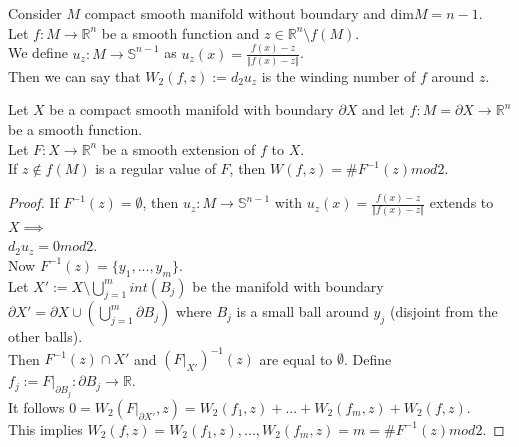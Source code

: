 \begin{remark}\label{8.7}
    Consider $M$ compact smooth manifold without boundary and dim$M=n-1$.\\
    Let $f:M\to\mathbb{R}^n$ be a smooth function and $z\in\mathbb{R}^n\setminus f(M)$.\\
    We define $u_z:M\to\mathbb{S}^{n-1}$ as $u_z(x)=\frac{f(x)-z}{\Vert f(x)-z\Vert}$.\\
    Then we can say that $W_2(f,z):=d_2u_z$ is the winding number of $f$ around $z$.
\end{remark}
\begin{lemma}\label{8.8}
    Let $X$ be a compact smooth manifold with boundary $\partial X$ and let $f:M=\partial X\to \mathbb{R}^n$ be a smooth function.\\
    Let $F:X\to\mathbb{R}^n$ be a smooth extension of $f$ to $X$.\\
    If $z\notin f(M)$ is a regular value of $F$, then $W(f,z)=\#F^{-1}(z) mod 2$.
\end{lemma}
\begin{proof}
    If $F^{-1}(z)=\emptyset$, then $u_z:M\to\mathbb{S}^{n-1}$ with $u_z(x)=\frac{f(x)-z}{\Vert f(x)-z\Vert}$ extends to $X\implies$\\ 
    $d_2u_z=0 mod 2$.\\
    Now $F^{-1}(z)=\{y_1,...,y_m\}$.\\
    Let $X':=X\setminus\bigcup_{j=1}^m int(B_j)$ be the manifold with boundary $\partial X'=\partial X\cup(\bigcup_{j=1}^m\partial B_j)$ where $B_j$ is a small ball around $y_j$ (disjoint from the other balls).\\
    Then $F^{-1}(z)\cap X'$ and $(F|_{X'})^{-1}(z)$ are equal to $\emptyset$. Define $f_j:=F|_{\partial B_j}:\partial B_j\to\mathbb{R}$.\\
    It follows $0=W_2(F|_{\partial X'},z)=W_2(f_1,z)+...+W_2(f_m,z)+W_2(f,z)$.\\
    This implies $W_2(f,z)=W_2(f_1,z),...,W_2(f_m,z)=m=\#F^{-1}(z) mod 2$.
\end{proof}